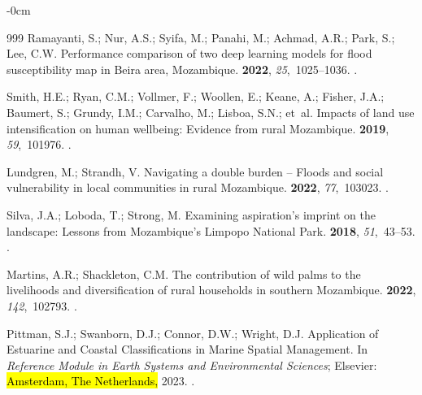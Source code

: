 \documentclass[coasts,article,accept,pdftex,oneauthor]{Definitions/mdpi}
\begin{document}
\begin{adjustwidth}{-\extralength}{0cm}
\begin{thebibliography}{999}
Ramayanti, S.; Nur, A.S.; Syifa, M.; Panahi, M.; Achmad, A.R.; Park, S.; Lee,
  C.W.
\newblock Performance comparison of two deep learning models for flood
  susceptibility map in Beira area, Mozambique.
 {\bf
  2022}, {\em 25},~1025--1036.
.

Smith, H.E.; Ryan, C.M.; Vollmer, F.; Woollen, E.; Keane, A.; Fisher, J.A.;
  Baumert, S.; Grundy, I.M.; Carvalho, M.; Lisboa, S.N.;  et~al.
\newblock Impacts of land use intensification on human wellbeing: Evidence from
  rural Mozambique.
 {\bf 2019}, {\em 59},~101976.
.

Lundgren, M.; Strandh, V.
\newblock Navigating a double burden – Floods and social vulnerability in
  local communities in rural Mozambique.
 {\bf 2022},
  {\em 77},~103023.
.

Silva, J.A.; Loboda, T.; Strong, M.
\newblock Examining aspiration’s imprint on the landscape: Lessons from
  Mozambique’s Limpopo National Park.
 {\bf 2018}, {\em 51},~43--53.
.

Martins, A.R.; Shackleton, C.M.
\newblock The contribution of wild palms to the livelihoods and diversification
  of rural households in southern Mozambique.
 {\bf 2022}, {\em 142},~102793.
.

Pittman, S.J.; Swanborn, D.J.; Connor, D.W.; Wright, D.J.
\newblock Application of Estuarine and Coastal Classifications in Marine
  Spatial Management. In {\em Reference Module in Earth Systems and
  Environmental Sciences}; Elsevier: \hl{Amsterdam, The Netherlands,}  2023.
.


\end{thebibliography}
\end{adjustwidth}
\end{document}
